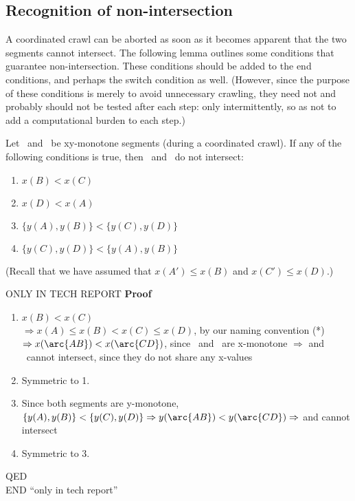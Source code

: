\subsection{Recognition of non-intersection}
\label{sec-endconds}
%
A coordinated crawl can be aborted as soon as
it becomes apparent that the two segments cannot intersect.
The following lemma outlines some conditions that guarantee non-intersection.
These conditions should be added to the end conditions, and perhaps
the switch condition as well.
(However, since the purpose of these conditions is merely to 
avoid unnecessary crawling, they need not and probably should not be 
tested after each step: only intermittently, so as not to add a computational
burden to each step.)
%
\begin{lemma}
\label{lem-badconds}
Let \ and \ be xy-monotone segments (during a coordinated 
crawl).
If any of the following conditions is true, then \ and \ do not
intersect:
\begin{enumerate}
	\item $x(B) < x(C)$
	\item $x(D) < x(A)$
	\item $\{y(A),y(B)\} < \{y(C),y(D)\}$
	\item $\{y(C),y(D)\} < \{y(A),y(B)\}$
\end{enumerate}
(Recall that we have assumed that $x(A') \leq x(B)$ and $x(C') \leq x(D)$.)
\end{lemma}
%
ONLY IN TECH REPORT
{\bf Proof} 
\begin{enumerate}
	\item $x(B) < x(C)$\\
      	      $\Rightarrow x(A) \leq x(B) < x(C) \leq x(D)$, by our naming
convention (*)\\
	      $\Rightarrow x(\arc{AB}) < x(\arc{CD})$, since \ and \ 
are x-monotone
	      $\Rightarrow$  and \ cannot intersect, since they do not
share any x-values
	\item Symmetric to 1.
	\item Since both segments are y-monotone,
		$\{y(A),y(B)\} < \{y(C),y(D)\} \Rightarrow y() < y()
\Rightarrow$ \arc{AB} and \arc{CD} cannot intersect
	\item Symmetric to 3.
\end{enumerate}
\hspace{3in}QED\\
END ``only in tech report''\\
%
